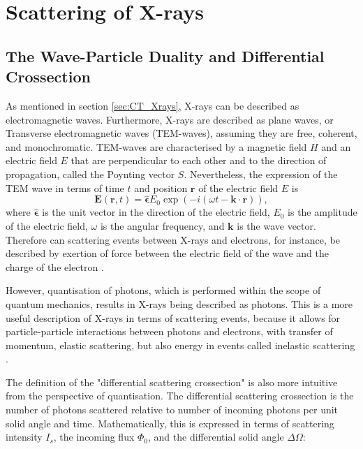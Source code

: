\chapter{Scattering of X-rays}

\section{The Wave-Particle Duality and Differential Crossection}
As mentioned in section \ref{sec:CT_Xrays}, X-rays can be described as electromagnetic waves.
Furthermore, X-rays are described as plane waves, or Transverse electromagnetic waves (TEM-waves), assuming they are free, coherent, and monochromatic.
TEM-waves are characterised by a magnetic field $H$ and an electric field $E$ that are perpendicular to each other and to the direction of propagation, called the Poynting vector $S$.
Nevertheless, the expression of the TEM wave in terms of time $t$ and position $\bm{r}$ of the electric field $E$ is
\begin{equation}\label{eq:TEM_wave}
    \bm{E}(\bm{r},t) = \bm{\widehat{\epsilon}}  E_{0} \exp\left(-i\left(\omega t - \bm{k}\cdot\bm{r}\right)\right),
\end{equation}
where $\bm{\widehat{\epsilon}}$ is the unit vector in the direction of the electric field, $E_{0}$ is the amplitude of the electric field, $\omega$ is the angular frequency, and $\bm{k}$ is the wave vector.
Therefore can scattering events between X-rays and electrons, for instance, be described by
exertion of force between the electric field of the wave and the charge of the electron \cite{mcmorrow2011elements}.

However, quantisation of photons, which is performed within the scope of quantum mechanics, results in X-rays being described as photons.
This is a more useful description of X-rays in terms of scattering events, because it allows for particle-particle interactions between photons and electrons,
with transfer of momentum, elastic scattering, but also energy in events called inelastic scattering \cite{mcmorrow2011elements}.

The definition of the "differential scattering crossection" is also more intuitive from the perspective of quantisation.
The differential scattering crossection is the number of photons scattered relative to number of incoming photons per unit solid angle and time.
Mathematically, this is expressed in terms of scattering intensity $I_{s}$, the incoming flux $\Phi_{0}$, and the differential solid angle $\Delta\Omega$:

